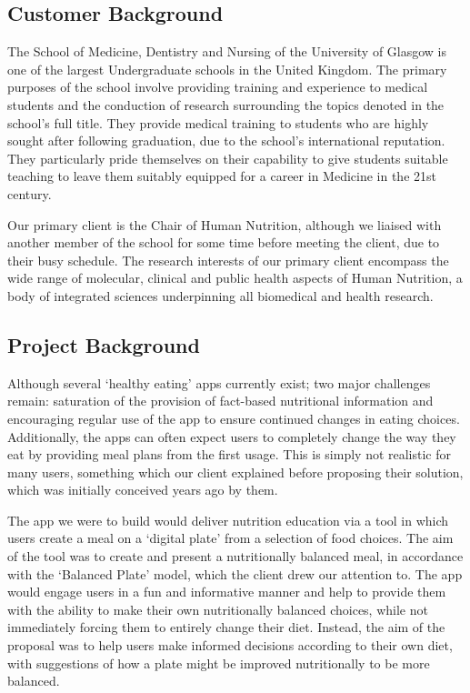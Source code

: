 \documentclass{l3proj}
\begin{document}
\subsection{Customer Background}
The School of Medicine, Dentistry and Nursing of the University of Glasgow is one of the largest Undergraduate schools in the United Kingdom. The primary purposes of the school involve providing training and experience to medical students and the conduction of research surrounding the topics denoted in the school's full title. They provide medical training to students who are highly sought after following graduation, due to the school's international reputation. They particularly pride themselves on their capability to give students suitable teaching to leave them suitably equipped for a career in Medicine in the 21st century. \par
Our primary client is the Chair of Human Nutrition, although we liaised with another member of the school for some time before meeting the client, due to their busy schedule. The research interests of our primary client encompass the wide range of molecular, clinical and public health aspects of Human Nutrition, a body of integrated sciences underpinning all biomedical and health research. \par
\subsection{Project Background}
Although several ‘healthy eating' apps currently exist; two major challenges remain: saturation of the provision of fact-based nutritional information and encouraging regular use of the app to ensure continued changes in eating choices. Additionally, the apps can often expect users to completely change the way they eat by providing meal plans from the first usage. This is simply not realistic for many users, something which our client explained before proposing their solution, which was initially conceived years ago by them. \par
The app we were to build would deliver nutrition education via a tool in which users create a meal on a ‘digital plate' from a selection of food choices. The aim of the tool was to create and present a nutritionally balanced meal, in accordance with the ‘Balanced Plate' model, which the client drew our attention to. The app would engage users in a fun and informative manner and help to provide them with the ability to make their own nutritionally balanced choices, while not immediately forcing them to entirely change their diet. Instead, the aim of the proposal was to help users make informed decisions according to their own diet, with suggestions of how a plate might be improved nutritionally to be more balanced.\par
\end{document}
